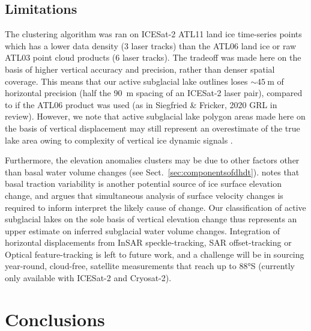 \subsection{Limitations}

The clustering algorithm was ran on ICESat-2 ATL11 land ice time-series \citep{SmithATLASICESat2L3B2021} points which has a lower data density (3 laser tracks) than the ATL06 land ice \citep{SmithATLASICESat2L3A2020} or raw ATL03 \citep{NeumannATLASICESat2L2A2020} point cloud products (6 laser tracks).
The tradeoff was made here on the basis of higher vertical accuracy and precision, rather than denser spatial coverage.
This means that our active subglacial lake outlines loses $\sim\SI{45}{\metre}$ of horizontal precision (half the \SI{90}{\metre} spacing of an ICESat-2 laser pair), compared to if the ATL06 product was used (as in Siegfried \& Fricker, 2020 GRL in review). %
However, we note that active subglacial lake polygon areas made here on the basis of vertical displacement may still represent an overestimate of the true lake area owing to complexity of vertical ice dynamic signals \citep[c.f.][]{SergienkoCausessuddenshortterm2007,LiRadarSoundingConfirms2020}.

Furthermore, the elevation anomalies clusters may be due to other factors other than basal water volume changes (see Sect.~\ref{sec:componentsofdhdt}).
\citet{SergienkoCausessuddenshortterm2007} notes that basal traction variability is another potential source of ice surface elevation change, and argues that simultaneous analysis of surface velocity changes \citep[e.g.][]{SiegfriedEpisodicicevelocity2016} is required to inform interpret the likely cause of change.
Our classification of active subglacial lakes on the sole basis of vertical elevation change thus represents an upper estimate on inferred subglacial water volume changes.
Integration of horizontal displacements from InSAR speckle-tracking, SAR offset-tracking or Optical feature-tracking \citep[e.g.][]{GardnerIncreasedWestAntarctic2018} is left to future work, and a challenge will be in sourcing year-round, cloud-free, satellite measurements that reach up to 88°S (currently only available with ICESat-2 and Cryosat-2).

\section{Conclusions}

